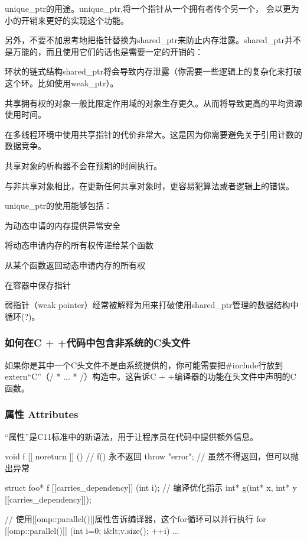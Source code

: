 unique_ptr的用途。unique_ptr,将一个指针从一个拥有者传个另一个， 会以更为小的开销来更好的实现这个功能。

另外，不要不加思考地把指针替换为shared_ptr来防止内存泄露。shared_ptr并不是万能的，而且使用它们的话也是需要一定的开销的：
\begindot
\item 环状的链式结构shared_ptr将会导致内存泄露（你需要一些逻辑上的复杂化来打破这个环。比如使用weak_ptr）。
\item 共享拥有权的对象一般比限定作用域的对象生存更久。从而将导致更高的平均资源使用时间。
\item 在多线程环境中使用共享指针的代价非常大。这是因为你需要避免关于引用计数的数据竞争。
\item 共享对象的析构器不会在预期的时间执行。
\item 与非共享对象相比，在更新任何共享对象时，更容易犯算法或者逻辑上的错误。
\myenddot

unique_ptr的使用能够包括：
\begindot
\item 为动态申请的内存提供异常安全
\item 将动态申请内存的所有权传递给某个函数
\item 从某个函数返回动态申请内存的所有权
\item 在容器中保存指针
\myenddot

弱指针（weak pointer）经常被解释为用来打破使用shared_ptr管理的数据结构中循环(?)。

\subsubsection{如何在C + +代码中包含非系统的C头文件}
如果你是其中一个C头文件不是由系统提供的，你可能需要把\#include行放到extern“C”（/ * ... * /）构造中。这告诉C + +编译器的功能在头文件中声明的C函数。
\subsubsection{属性 Attributes}
“属性”是C11标准中的新语法，用于让程序员在代码中提供额外信息。
\begin{Code}
	void f [[ noreturn ]] () // f() 永不返回
	{
		throw "error"; // 虽然不得返回，但可以抛出异常
	}
		
	struct foo* f [[carries_dependency]] (int i); // 编译优化指示
	int* g(int* x, int* y [[carries_dependency]]);
	
	// 使用[[omp::parallel()]]属性告诉编译器，这个for循环可以并行执行
	for [[omp::parallel()]] (int i=0; i&lt;v.size(); ++i) { ... }	
\end{Code}

